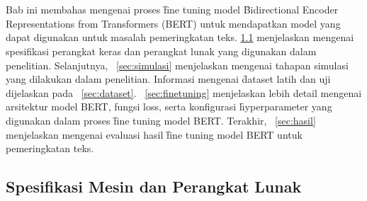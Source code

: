 \chapter{\babEmpat}
\label{bab:4}

Bab ini membahas mengenai proses \f{fine tuning} model \f{Bidirectional Encoder Representations from Transformers} (BERT) untuk mendapatkan model yang dapat digunakan untuk masalah pemeringkatan teks.
\sect\ref{sec:spesifikasi} menjelaskan mengenai spesifikasi perangkat keras dan perangkat lunak yang digunakan dalam penelitian. Selanjutnya, \sect~\ref{sec:simulasi} menjelaskan mengenai tahapan simulasi yang dilakukan dalam penelitian. Informasi mengenai \f{dataset} latih dan uji  dijelaskan pada \sect~\ref{sec:dataset}. \sect~\ref{sec:finetuning} menjelaskan lebih detail mengenai arsitektur model BERT, fungsi loss, serta konfigurasi \f{hyperparameter} yang digunakan dalam proses \f{fine tuning} model BERT. Terakhir, \sect~\ref{sec:hasil} menjelaskan mengenai evaluasi hasil \f{fine tuning} model BERT untuk pemeringkatan teks.

\section{Spesifikasi Mesin dan Perangkat Lunak}
\label{sec:spesifikasi}

